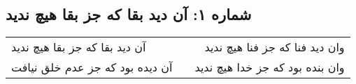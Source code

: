 \begin{center}
\section*{شماره ۱: آن دید بقا که جز بقا هیچ ندید}
\label{sec:001}
\begin{longtable}{l p{0.5cm} r}
آن دید بقا که جز بقا هیچ ندید
&&
وان دید فنا که جز فنا هیچ ندید
\\
آن دیده بود که جز عدم خلق نیافت
&&
وان بنده بود که جز خدا هیچ ندید
\\
\end{longtable}
\end{center}
